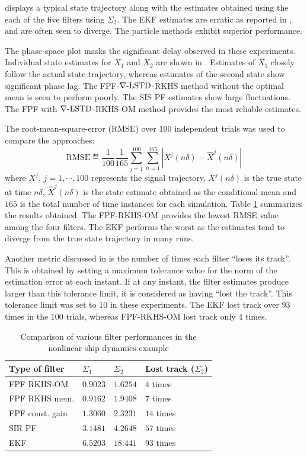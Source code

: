  displays a typical state trajectory along with the estimates obtained using the each of the five filters using  $\Sigma_2$. The EKF estimates are erratic as reported in \cite{budchelee07}, and are often seen to diverge. The particle methods exhibit superior performance.

The phase-space plot masks the significant delay observed in these experiments.   Individual state estimates for $X_{1}$ and $X_2$ are shown in .
Estimates of $X_1$ closely follow the actual state trajectory, whereas estimates of the second state  show  significant phase lag. The FPF-$\nabla\text{-LSTD}$-RKHS method without the optimal mean is seen to perform poorly. The SIS PF estimates show large fluctuations.
The FPF with $\nabla\text{-LSTD}$-RKHS-OM method provides the most reliable estimates.

The root-mean-square-error (RMSE) over $100$ independent trials was used to compare the approaches:
\[
\text{RMSE} \eqdef \frac{1}{100} \frac{1}{165} \sum_{j=1}^{100}\sum_{n=1}^{165} | X^j(n \delta) - \hat{X}^j(n \delta) |
\]
where $X^j, \, j= 1 ,\cdots, 100$ represents the signal trajectory, $X^j(n\delta)$ is the true state at time $n\delta$, $\hat{X}^j(n\delta)$ is the state estimate obtained as the conditional mean and $165$ is the total number of time instances for each simulation. Table \ref{table:fpf_rmse} summarizes the results obtained. The FPF-RKHS-OM provides the lowest RMSE value among the four filters. The EKF performs the worst as the estimates tend to diverge from the true state trajectory in many runs.

Another metric discussed in \cite{budchelee07} is the number of times each filter ``loses its track''. This is obtained by setting a maximum tolerance value for the norm of the estimation error at each instant. If at any instant, the filter estimates produce larger than this tolerance limit, it is considered as having ``lost the track''.   This tolerance limit was set to $10$ in these experiments. The EKF lost track over $93$ times in the $100$ trials, whereas FPF-RKHS-OM lost track only $4$ times.\
\begin{table}[htbp]
	\caption{Comparison of various filter performances in the nonlinear ship dynamics example}
		\begin{tabularx}{6.5in}{ XXXX }
			\hline
			Type of filter & $\Sigma_1$ & $\Sigma_2$ & Lost track ($\Sigma_2$) \\
			\hline
			FPF RKHS-OM & $0.9023$  &  $1.6254$ & $4$ times\\
			FPF RKHS mem. &$0.9162$ &  $ 1.9408$ & $ 7 $ times\\
			FPF const. gain & $1.3060$ & $2.3231$ & $14$ times \\
			SIR PF & $3.1481$  &  $4.2648$ &  $57$ times \\
			EKF &  $6.5203$ & $18.441$ & $93$ times \\ 		
			\hline
		\end{tabularx}
		\label{table:fpf_rmse}
\end{table}

